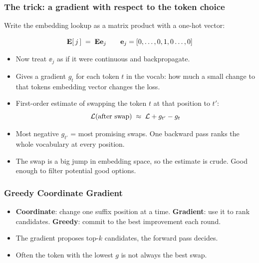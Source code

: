 \begin{frame}
\frametitle{The trick: a gradient with respect to the token choice}
Write the embedding lookup as a matrix product with a one-hot vector:
\begin{block}{}
$$
\mathbf{E}[\,j\,] \;=\; \mathbf{E} \mathbf{e}_j
\qquad \mathbf{e}_j = [0, \ldots, 0, 1, 0 \ldots, 0]
$$
\end{block}
\begin{itemize}
    \item Now treat $\ee_j$ as if it were continuous and backpropagate.
    \item Gives a gradient $g_t$ for each token $t$ in the vocab: how much a small change to
    that tokens embedding vector changes the loss.
    \item First-order estimate of swapping the token $t$ at that position to $t'$:
    $$
    \mathcal{L}(\text{after swap}) \;\approx\; \mathcal{L} + g_{t'} - g_{t}
    $$
    \item Most negative $g_{t'}$ = most promising swaps. One backward pass ranks
    the whole vocabulary at every position.
    \item The swap is a big jump in embedding space, so the estimate is crude.
    Good enough to filter potential good options.
\end{itemize}
\end{frame}

\begin{frame}
\frametitle{Greedy Coordinate Gradient}
\begin{center}
\end{center}
\begin{itemize}
    \item \textbf{Coordinate}: change one suffix position at a time.
    \textbf{Gradient}: use it to rank candidates. \textbf{Greedy}: commit to the
    best improvement each round.
    \item The gradient proposes top-$k$ candidates, the forward pass decides. 
    \item Often the token with the
    lowest $g$ is not always the best swap.
\end{itemize}
\end{frame}

